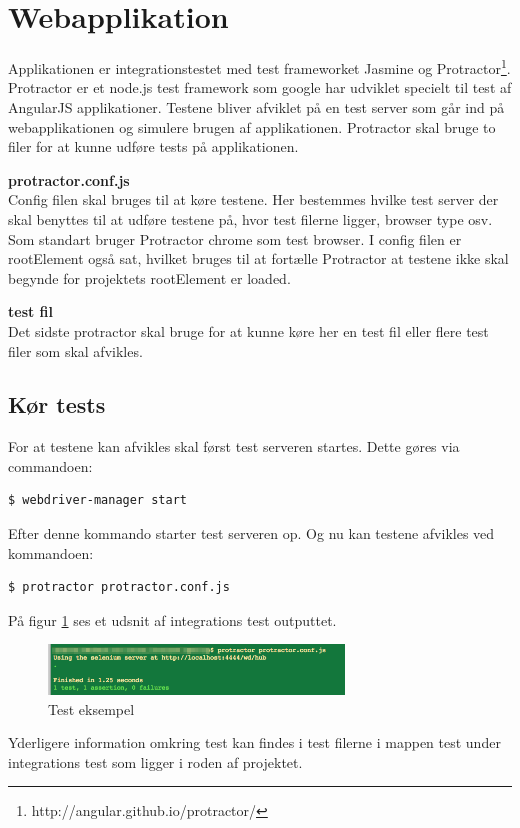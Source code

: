 \section{Webapplikation}
Applikationen er integrationstestet med test frameworket Jasmine og Protractor\footnote{http://angular.github.io/protractor/}. Protractor er et node.js test framework som google har udviklet specielt til test af AngularJS applikationer. Testene bliver afviklet på en test server som går ind på webapplikationen og simulere brugen af applikationen. Protractor skal bruge to filer for at kunne udføre tests på applikationen.\linebreak

\textbf{protractor.conf.js}\\
Config filen skal bruges til at køre testene. Her bestemmes hvilke test server der skal benyttes til at udføre testene på, hvor test filerne ligger, browser type osv. Som standart bruger Protractor chrome som test browser. I config filen er rootElement også sat, hvilket bruges til at fortælle Protractor at testene ikke skal begynde for projektets rootElement er loaded. 

\textbf{test fil}\\
Det sidste protractor skal bruge for at kunne køre her en test fil eller flere test filer som skal afvikles. 

\subsection{Kør tests}
For at testene kan afvikles skal først test serveren startes. Dette gøres via commandoen:

\begin{lstlisting}[language=bash]
	$ webdriver-manager start
\end{lstlisting}

Efter denne kommando starter test serveren op. Og nu kan testene afvikles ved kommandoen:

\begin{lstlisting}[language=bash]
	$ protractor protractor.conf.js
\end{lstlisting}

På figur \ref{fig:integration_exampel} ses et udsnit af integrations test outputtet.

\vspace{-5pt}
\begin{figure}[H]
	\centering
	\includegraphics[width=0.7\textwidth]{Billeder/Test/integration_web.png}
	\vspace{-5pt}
	\caption{Test eksempel}
	\label{fig:integration_exampel}
\end{figure}

Yderligere information omkring test kan findes i test filerne i mappen test under integrations test som ligger i roden af projektet.